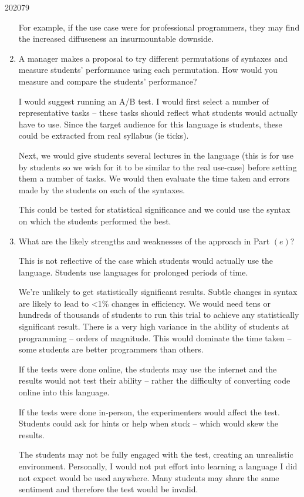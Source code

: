 \documentclass[10pt,\jkfside,a4paper]{article}
\begin{document}
\begin{examquestion}{2020}{7}{9}
\begin{enumerate}
For example, if the use case were for professional programmers, they may
find the increased diffuseness an insurmountable downside.

\item A manager makes a proposal to try different permutations of syntaxes
and measure students' performance using each permutation. How would you
measure and compare the students' performance?

I would suggest running an A/B test. I would first select a number of
representative tasks -- these tasks should reflect what students would
actually have to use. Since the target audience for this language is
students, these could be extracted from real syllabus (ie ticks).

Next, we would give students several lectures in the language (this is for
use by students so we wish for it to be similar to the real use-case)
before setting them a number of tasks. We would then evaluate the time
taken and errors made by the students on each of the syntaxes.

This could be tested for statistical significance and we could use the
syntax on which the students performed the best.

\item What are the likely strengths and weaknesses of the approach in Part
$(e)$?

This is not reflective of the case which students would actually use the
language. Students use languages for prolonged periods of time.

We're unlikely to get statistically significant results. Subtle changes in
syntax are likely to lead to <1\% changes in efficiency. We would need tens
or hundreds of thousands of students to run this trial to achieve any
statistically significant result. There is a very high variance in the
ability of students at programming -- orders of magnitude. This would
dominate the time taken -- some students are better programmers than others.

If the tests were done online, the students may use the internet and the
results would not test their ability -- rather the difficulty of converting
code online into this language.

If the tests were done in-person, the experimenters would affect the test.
Students could ask for hints or help when stuck -- which would skew the
results.

The students may not be fully engaged with the test, creating an
unrealistic environment. Personally, I would not put effort into learning a
language I did not expect would be used anywhere. Many students may share
the same sentiment and therefore the test would be invalid.

\end{enumerate}

\end{examquestion}
\end{document}
